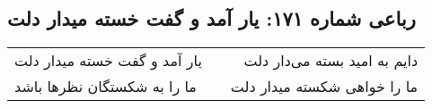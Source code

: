 \begin{center}
\section*{رباعی شماره ۱۷۱: یار آمد و گفت خسته میدار دلت}
\label{sec:sh171}
\begin{longtable}{l p{0.5cm} r}
یار آمد و گفت خسته میدار دلت
&&
دایم به امید بسته می‌دار دلت
\\
ما را به شکستگان نظرها باشد
&&
ما را خواهی شکسته میدار دلت
\\
\end{longtable}
\end{center}
